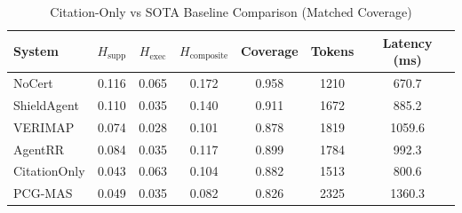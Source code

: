 \begin{table}[h]
\centering
\small
\caption{Citation-Only vs SOTA Baseline Comparison (Matched Coverage)}
\label{tab:rebuttal_preview_citation_only}
\begin{tabular}{l|cc|c|c|cc}
\hline
System & $H_{\mathrm{supp}}$ & $H_{\mathrm{exec}}$ & $H_{\mathrm{composite}}$ & Coverage & Tokens & Latency (ms) \\
\hline
NoCert & 0.116 & 0.065 & 0.172 & 0.958 & 1210 & 670.7 \\
ShieldAgent & 0.110 & 0.035 & 0.140 & 0.911 & 1672 & 885.2 \\
VERIMAP & 0.074 & 0.028 & 0.101 & 0.878 & 1819 & 1059.6 \\
AgentRR & 0.084 & 0.035 & 0.117 & 0.899 & 1784 & 992.3 \\
CitationOnly & 0.043 & 0.063 & 0.104 & 0.882 & 1513 & 800.6 \\
PCG-MAS & 0.049 & 0.035 & 0.082 & 0.826 & 2325 & 1360.3 \\
\hline
\end{tabular}
\end{table}
